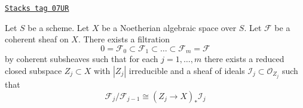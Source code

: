 \begin{lemma}
\label{spaces-cohomology-lemma-coherent-filter}
\href{https://stacks.math.columbia.edu/tag/07UR}{\texttt{Stacks tag 07UR}}

Let $S$ be a scheme. Let $X$ be a Noetherian algebraic space over $S$.
Let $\mathcal{F}$ be a coherent sheaf on $X$. There exists a filtration
$$
0 = \mathcal{F}_0 \subset \mathcal{F}_1 \subset
\ldots \subset \mathcal{F}_m = \mathcal{F}
$$
by coherent subsheaves such that for each $j = 1, \ldots, m$
there exists a reduced closed subspace $Z_j \subset X$ with $|Z_j|$
irreducible and a sheaf of ideals $\mathcal{I}_j \subset \mathcal{O}_{Z_j}$
such that
$$
\mathcal{F}_j/\mathcal{F}_{j - 1}
\cong (Z_j \to X)_* \mathcal{I}_j
$$
\end{lemma}

